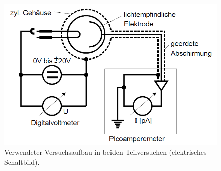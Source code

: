 \begin{figure}
    \centering
    \includegraphics[width=15cm]{Bilder/StromZeug.png}
    \caption{Verwendeter Versuchsaufbau in beiden Teilversuchen (elektrisches Schaltbild).\cite{sample}}
    \label{Abb:StromZeug}
\end{figure}

